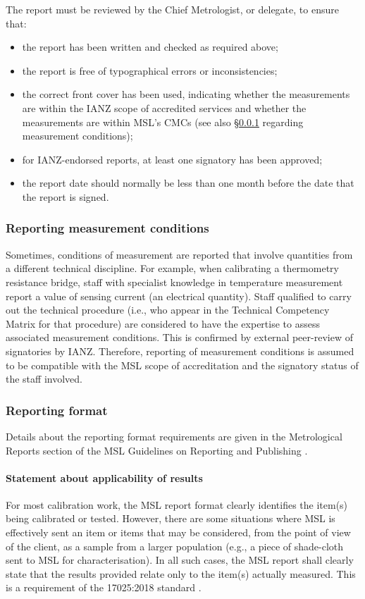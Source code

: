 The report must be reviewed by the Chief Metrologist, or delegate, to ensure that:
\begin{itemize}
\item the report has been written and checked as required above;
\item the report is free of typographical errors or inconsistencies;
\item the correct front cover has been used, indicating whether the measurements are within the IANZ scope of accredited services and whether the measurements are within MSL’s CMCs (see also \S\ref{sss:measurement_conditions} regarding measurement conditions);
\item for IANZ-endorsed reports, at least one signatory has been approved;
\item the report date should normally be less than one month before the date that the report is signed.
\end{itemize} 

\subsubsection{Reporting measurement conditions}
\label{sss:measurement_conditions}
Sometimes, conditions of measurement are reported that involve quantities from a different technical discipline. For example, when calibrating a thermometry resistance bridge, staff with specialist knowledge in temperature measurement report a value of sensing current (an electrical quantity). Staff qualified to carry out the technical procedure (i.e., who appear in the Technical Competency Matrix for that procedure) are considered to have the expertise to assess associated measurement conditions. This is confirmed by external peer-review of signatories by IANZ. Therefore, reporting of measurement conditions is assumed to be compatible with the MSL scope of accreditation and the signatory status of the staff involved.

\subsubsection{Reporting format}
Details about the reporting format requirements are given in the Metrological Reports section of the MSL Guidelines on Reporting and Publishing \cite[\S\ref*{GRP-s:metrological_reports}]{MSL_Reporting_Guidelines}.

\paragraph{Statement about applicability of results}
For most calibration work, the MSL report format clearly identifies the item(s) being calibrated or tested. However, there are some situations where MSL is effectively sent an item or items that may be considered, from the point of view of the client, as a sample from a larger population (e.g., a piece of shade-cloth sent to MSL for characterisation). In all such cases, the MSL report shall clearly state that the results provided relate only to the item(s) actually measured. This is a requirement of the 17025:2018 standard \cite[clause 7.8.2.1~(l)]{ISO_17025}.      

